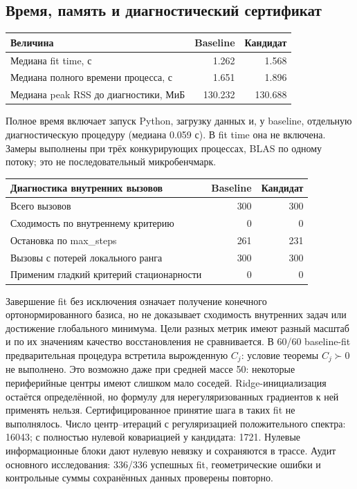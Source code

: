 \subsection{Время, память и диагностический сертификат}
\begin{center}\small\begin{tabular}{@{}lrr@{}}\toprule Величина & Baseline & Кандидат\\\midrule
Медиана fit time, с & 1.262 & 1.568\\
Медиана полного времени процесса, с & 1.651 & 1.896\\
Медиана peak RSS до диагностики, МиБ & 130.232 & 130.688\\
\bottomrule\end{tabular}\end{center}
Полное время включает запуск Python, загрузку данных и, у baseline, отдельную диагностическую процедуру (медиана 0.059 с). В fit time она не включена. Замеры выполнены при трёх конкурирующих процессах, BLAS по одному потоку; это не последовательный микробенчмарк.
\begin{center}\small\begin{tabular}{@{}lrr@{}}\toprule Диагностика внутренних вызовов & Baseline & Кандидат\\\midrule
Всего вызовов & 300 & 300\\
Сходимость по внутреннему критерию & 0 & 0\\
Остановка по max\_steps & 261 & 231\\
Вызовы с потерей локального ранга & 300 & 300\\
Применим гладкий критерий стационарности & 0 & 0\\
\bottomrule\end{tabular}\end{center}
Завершение fit без исключения означает получение конечного ортонормированного базиса, но не доказывает сходимость внутренних задач или достижение глобального минимума. Цели разных метрик имеют разный масштаб и по их значениям качество восстановления не сравнивается.
В 60/60 baseline-fit предварительная процедура встретила вырожденную $C_j$: условие теоремы $C_j\succ0$ не выполнено. Это возможно даже при средней массе 50: некоторые периферийные центры имеют слишком мало соседей. Ridge-инициализация остаётся определённой, но формулу для нерегуляризованных градиентов к ней применять нельзя. Сертифицированное принятие шага в таких fit не выполнялось.
Число центр--итераций с регуляризацией положительного спектра: 16043; с полностью нулевой ковариацией у кандидата: 1721. Нулевые информационные блоки дают нулевую невязку и сохраняются в трассе.
Аудит основного исследования: 336/336 успешных fit, геометрические ошибки и контрольные суммы сохранённых данных проверены повторно.
